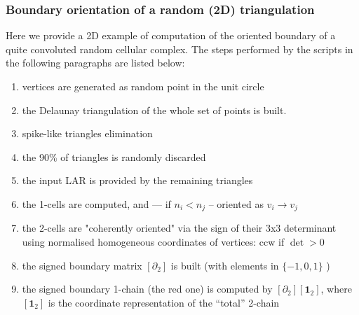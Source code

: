 \documentclass[11pt,oneside]{article}	%
\begin{document}
\subsubsection{Boundary orientation of a random (2D) triangulation}

Here we provide a 2D example of computation of the oriented boundary of a quite convoluted random cellular complex. The steps performed by the scripts in the following paragraphs are listed below:

\begin{enumerate}
\item	vertices are generated as random point in the unit circle
\item	the Delaunay triangulation of the whole set of points is built.
\item	spike-like triangles elimination
\item	the 90\% of triangles is randomly discarded
\item	the input LAR is provided by the remaining triangles
\item	the 1-cells are computed, and —  if  $n_i < n_j$ -- oriented as $v_i \to v_j$
\item	the 2-cells are "coherently oriented" via the sign of their 3x3 determinant 
	using normalised homogeneous coordinates of vertices: ccw if $\det > 0$
\item	the signed boundary matrix $[\partial_2]$ is built (with elements in $\{-1,0,1\}$ )
\item	the signed boundary 1-chain (the red one) is computed by $[\partial_2][\mathbf{1}_2]$,
	where $[\mathbf{1}_2]$ is the coordinate representation of the “total” 2-chain
\end{enumerate}
\end{document}
